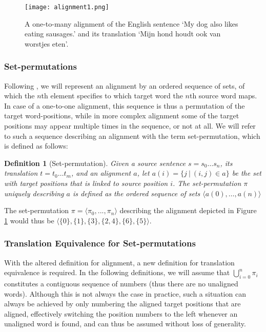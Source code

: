 \documentclass{report}
\theoremstyle{definition}
\theoremstyle{plain}
\newtheorem{definition}{Definition}
\begin{document}
\begin{figure}
\centering
\texttt{[image: alignment1.png]}
\caption{A one-to-many alignment of the English sentence `My dog also likes eating sausages.' and its translation `Mijn hond houdt ook van worstjes eten'.%
\cite{maillette2010visualizing}
}\label{fig:alignment2}
\end{figure}

\subsubsection{Set-permutations}

Following \cite{simaan2013hats}, we will represent an alignment by an ordered sequence of sets, of which the $n$th element specifies to which target word the $n$th source word maps. In case of a one-to-one alignment, this sequence is thus a permutation of the target word-positions, while in more complex alignment some of the target positions may appear multiple times in the sequence, or not at all. We will refer to such a sequence describing an alignment with the term set-permutation, which is defined as follows:

\begin{definition}[Set-permutation]\label{def:sperm}
Given a source sentence $s = s_0 \ldots s_n$, its translation $t = t_0 \ldots t_m$, and an alignment $a$, let $a(i) = \{j~|~(i,j)\in a\}$ be the set with target positions that is linked to source position $i$. The set-permutation $\pi$ uniquely describing $a$ is defined as the ordered sequence of sets
$\langle a(0), \ldots, a(n) \rangle$
\end{definition}

\noindent The set-permutation $\pi = \langle\pi_0, ..., \pi_n\rangle$ describing the alignment depicted in Figure \ref{fig:alignment2} would thus be $\langle \{0\}, \{1\}, \{3\}, \{2,4\}, \{6\}, \{5\}\rangle$. 

\subsubsection{Translation Equivalence for Set-permutations}

With the altered definition for alignment, a new definition for translation equivalence is required. In the following definitions, we will assume that $\bigcup_{i=0}^{n} \pi_i$ constitutes a contiguous sequence of numbers (thus there are no unaligned words). Although this is not always the case in practice, such a situation can always be achieved by only numbering the aligned target positions that are aligned, effectively switching the position numbers to the left whenever an unaligned word is found, and can thus be assumed without loss of generality.
\end{document}
